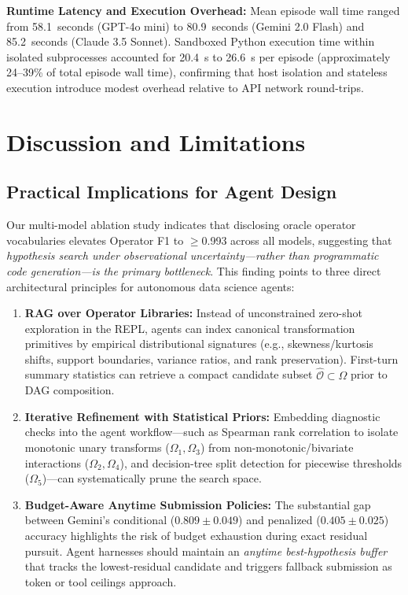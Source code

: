\documentclass[sigconf]{acmart}
\begin{document}
\noindent\textbf{Runtime Latency and Execution Overhead:} Mean episode wall time ranged from 58.1~seconds (GPT-4o mini) to 80.9~seconds (Gemini 2.0 Flash) and 85.2~seconds (Claude 3.5 Sonnet). Sandboxed Python execution time within isolated subprocesses accounted for 20.4~s to 26.6~s per episode (approximately 24--39\% of total episode wall time), confirming that host isolation and stateless execution introduce modest overhead relative to API network round-trips.

\section{Discussion and Limitations}

\subsection{Practical Implications for Agent Design}
Our multi-model ablation study indicates that disclosing oracle operator vocabularies elevates Operator F1 to $\ge$0.993 across all models, suggesting that \emph{hypothesis search under observational uncertainty—rather than programmatic code generation—is the primary bottleneck}. This finding points to three direct architectural principles for autonomous data science agents:
\begin{enumerate}
    \item \textbf{RAG over Operator Libraries:} Instead of unconstrained zero-shot exploration in the REPL, agents can index canonical transformation primitives by empirical distributional signatures (e.g., skewness/kurtosis shifts, support boundaries, variance ratios, and rank preservation). First-turn summary statistics can retrieve a compact candidate subset $\widehat{\mathcal{O}} \subset \Omega$ prior to DAG composition.
    \item \textbf{Iterative Refinement with Statistical Priors:} Embedding diagnostic checks into the agent workflow—such as Spearman rank correlation to isolate monotonic unary transforms ($\Omega_1, \Omega_3$) from non-monotonic/bivariate interactions ($\Omega_2, \Omega_4$), and decision-tree split detection for piecewise thresholds ($\Omega_5$)—can systematically prune the search space.
    \item \textbf{Budget-Aware Anytime Submission Policies:} The substantial gap between Gemini's conditional ($0.809 \pm 0.049$) and penalized ($0.405 \pm 0.025$) accuracy highlights the risk of budget exhaustion during exact residual pursuit. Agent harnesses should maintain an \emph{anytime best-hypothesis buffer} that tracks the lowest-residual candidate and triggers fallback submission as token or tool ceilings approach.
\end{enumerate}
\end{document}
